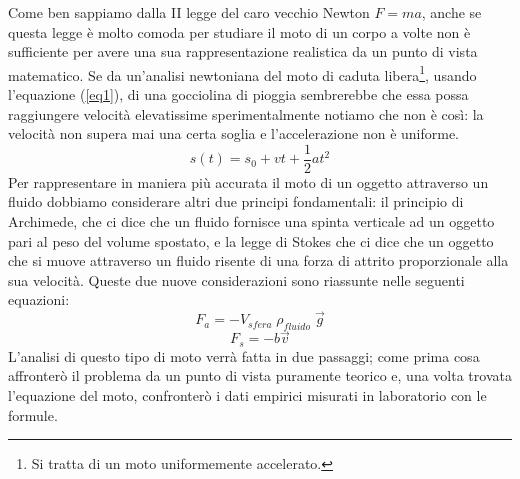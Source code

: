 Come ben sappiamo dalla II legge del caro vecchio Newton \(F=ma\), anche se questa legge è molto comoda per studiare il moto di un corpo a volte non è sufficiente per avere una sua rappresentazione realistica da un punto di vista matematico. Se da un'analisi newtoniana del moto di caduta libera\footnote{Si tratta di un moto uniformemente accelerato.}, usando l'equazione (\ref{eq1}), di una gocciolina di pioggia sembrerebbe che essa possa raggiungere velocità elevatissime sperimentalmente notiamo che non è così: la velocità non supera mai una certa soglia e l'accelerazione non è uniforme.
\begin{equation}\label{eq1}
    s(t)=s_0 + vt + \frac{1}{2}at^2
\end{equation}
Per rappresentare in maniera più accurata il moto di un oggetto attraverso un fluido dobbiamo considerare altri due principi fondamentali: il principio di Archimede, che ci dice che un fluido fornisce una spinta verticale ad un oggetto pari al peso del volume spostato, e la legge di Stokes che ci dice che un oggetto che si muove attraverso un fluido risente di una forza di attrito proporzionale alla sua velocità. Queste due nuove considerazioni sono riassunte nelle seguenti equazioni:
\begin{equation}\label{eq2}
    F_a=-V_{sfera}\;\rho_{fluido}\;\vec g
\end{equation}
\begin{equation}\label{eq3}
    F_s=-b\vec v
\end{equation}
L'analisi di questo tipo di moto verrà fatta in due passaggi; come prima cosa affronterò il problema da un punto di vista puramente teorico e, una volta trovata l'equazione del moto, confronterò i dati empirici misurati in laboratorio con le formule.  
\bigskip

